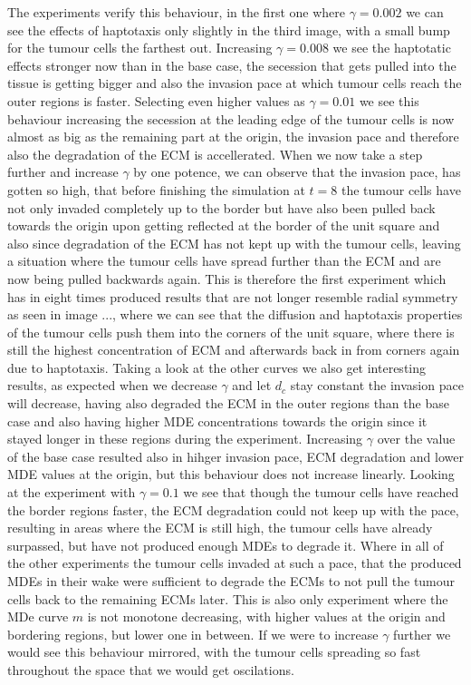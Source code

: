 The experiments verify this behaviour, in the first one where $\gamma=0.002$ we can see the effects of haptotaxis only slightly in the third image, with a small bump for the tumour cells the farthest out. Increasing $\gamma=0.008$ we see the haptotatic effects stronger now than in the base case, the secession that gets pulled into the tissue is getting bigger and also the invasion pace at which tumour cells reach the outer regions is faster. Selecting even higher values as $\gamma = 0.01$ we see this behaviour increasing the secession at the leading edge of the tumour cells is now almost as big as the remaining part at the origin, the invasion pace and therefore also the degradation of the ECM is accellerated. When we now take a step further and increase $\gamma$ by one potence, we can observe that the invasion pace, has gotten so high, that before finishing the simulation at $t=8$ the tumour cells have not only invaded completely up to the border but have also been pulled back towards the origin upon getting reflected at the border of the unit square and also since degradation of the ECM has not kept up with the tumour cells, leaving a situation where the tumour cells have spread further than the ECM and are now being pulled backwards again. This is therefore the first experiment which has in eight times produced results that are not longer resemble radial symmetry as seen in image ..., where we can see that the diffusion and haptotaxis properties of the tumour cells push them into the corners of the unit square, where there is still the highest concentration of ECM and afterwards back in from corners again due to haptotaxis.
Taking a look at the other curves we also get interesting results, as expected when we decrease $\gamma$ and let $d_c$ stay constant the invasion pace will decrease, having also degraded the ECM in the outer regions than the base case and also having higher MDE concentrations towards the origin since it stayed longer in these regions during the experiment. Increasing $\gamma$ over the value of the base case resulted also in hihger invasion pace, ECM degradation and lower MDE values at the origin, but this behaviour does not increase linearly. Looking at the experiment with $\gamma=0.1$ we see that though the tumour cells have reached the border regions faster, the ECM degradation could not keep up with the pace, resulting in areas where the ECM is still high, the tumour cells have already surpassed, but have not produced enough MDEs to degrade it. Where in all of the other experiments the tumour cells invaded at such a pace, that the produced MDEs in their wake were sufficient to degrade the ECMs to not pull the tumour cells back to the remaining ECMs later. This is also only experiment where the MDe curve $m$ is not monotone decreasing, with higher values at the origin and bordering regions, but lower one in between. If we were to increase $\gamma$ further we would see this behaviour mirrored, with the tumour cells spreading so fast throughout the space that we would get oscilations.

